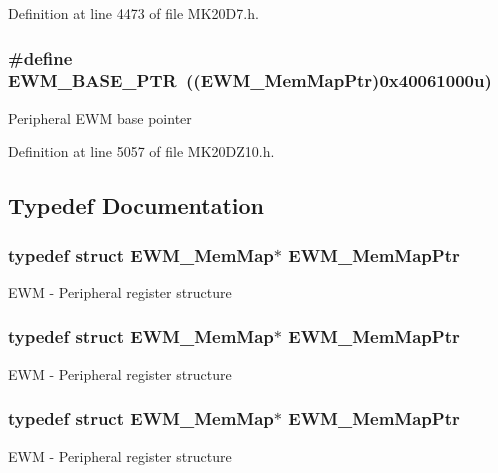 Definition at line 4473 of file M\+K20\+D7.\+h.

\subsubsection[{\texorpdfstring{E\+W\+M\+\_\+\+B\+A\+S\+E\+\_\+\+P\+TR}{EWM_BASE_PTR}}]{\setlength{\rightskip}{0pt plus 5cm}\#define E\+W\+M\+\_\+\+B\+A\+S\+E\+\_\+\+P\+TR~(({\bf E\+W\+M\+\_\+\+Mem\+Map\+Ptr})0x40061000u)}\hypertarget{group___e_w_m___peripheral_gae3454b5b37183b746362498d1fafc40c}{}\label{group___e_w_m___peripheral_gae3454b5b37183b746362498d1fafc40c}
Peripheral E\+WM base pointer 

Definition at line 5057 of file M\+K20\+D\+Z10.\+h.



\subsection{Typedef Documentation}
\subsubsection[{\texorpdfstring{E\+W\+M\+\_\+\+Mem\+Map\+Ptr}{EWM_MemMapPtr}}]{\setlength{\rightskip}{0pt plus 5cm}typedef struct {\bf E\+W\+M\+\_\+\+Mem\+Map}$\ast$ {\bf E\+W\+M\+\_\+\+Mem\+Map\+Ptr}}\hypertarget{group___e_w_m___peripheral_ga1de35bc04fc7fa4929507210147339a6}{}\label{group___e_w_m___peripheral_ga1de35bc04fc7fa4929507210147339a6}
E\+WM -\/ Peripheral register structure 
\subsubsection[{\texorpdfstring{E\+W\+M\+\_\+\+Mem\+Map\+Ptr}{EWM_MemMapPtr}}]{\setlength{\rightskip}{0pt plus 5cm}typedef struct {\bf E\+W\+M\+\_\+\+Mem\+Map}$\ast$ {\bf E\+W\+M\+\_\+\+Mem\+Map\+Ptr}}\hypertarget{group___e_w_m___peripheral_ga1de35bc04fc7fa4929507210147339a6}{}\label{group___e_w_m___peripheral_ga1de35bc04fc7fa4929507210147339a6}
E\+WM -\/ Peripheral register structure 
\subsubsection[{\texorpdfstring{E\+W\+M\+\_\+\+Mem\+Map\+Ptr}{EWM_MemMapPtr}}]{\setlength{\rightskip}{0pt plus 5cm}typedef struct {\bf E\+W\+M\+\_\+\+Mem\+Map}$\ast$ {\bf E\+W\+M\+\_\+\+Mem\+Map\+Ptr}}\hypertarget{group___e_w_m___peripheral_ga1de35bc04fc7fa4929507210147339a6}{}\label{group___e_w_m___peripheral_ga1de35bc04fc7fa4929507210147339a6}
E\+WM -\/ Peripheral register structure 